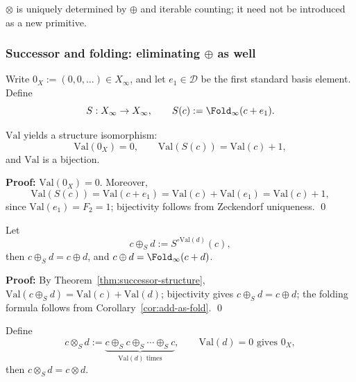 \begin{corollary}\label{cor:mul-no-new-primitive}
$\otimes$ is uniquely determined by $\oplus$ and iterable counting; it need not be introduced as a new primitive.
\end{corollary}

\subsubsection{Successor and folding: eliminating \texorpdfstring{$\oplus$}{oplus} as well}\label{subsec:succ-and-fold}
\begin{definition}\label{def:successor-fold}
Write $0_X:=(0,0,\dots)\in X_\infty$, and let $e_1\in\mathcal{D}$ be the first standard basis element. Define
\[
S:X_\infty\to X_\infty,\qquad S(c):=\Fold_\infty(c+e_1).
\]
\end{definition}

\begin{theorem}\label{thm:successor-structure}
$\mathrm{Val}$ yields a structure isomorphism:
\[
\mathrm{Val}(0_X)=0,\qquad \mathrm{Val}(S(c))=\mathrm{Val}(c)+1,
\]
and $\mathrm{Val}$ is a bijection.
\end{theorem}

\textbf{Proof:}
$\mathrm{Val}(0_X)=0$. Moreover,
\[
\mathrm{Val}(S(c))=\mathrm{Val}(c+e_1)=\mathrm{Val}(c)+\mathrm{Val}(e_1)=\mathrm{Val}(c)+1,
\]
since $\mathrm{Val}(e_1)=F_2=1$; bijectivity follows from Zeckendorf uniqueness. \qed

\begin{corollary}\label{cor:add-from-successor}
Let
\[
c\oplus_S d:=S^{\circ\mathrm{Val}(d)}(c),
\]
then $c\oplus_S d=c\oplus d$, and $c\oplus d=\Fold_\infty(c+d)$.
\end{corollary}

\textbf{Proof:}
By Theorem~\ref{thm:successor-structure}, $\mathrm{Val}(c\oplus_S d)=\mathrm{Val}(c)+\mathrm{Val}(d)$; bijectivity gives $c\oplus_S d=c\oplus d$; the folding formula follows from Corollary~\ref{cor:add-as-fold}. \qed

\begin{theorem}\label{thm:mul-from-successor}
Define
\[
c\otimes_S d:=\underbrace{c\oplus_S c\oplus_S\cdots\oplus_S c}_{\mathrm{Val}(d)\text{ times}},
\qquad \mathrm{Val}(d)=0\text{ gives }0_X,
\]
then $c\otimes_S d=c\otimes d$.
\end{theorem}

